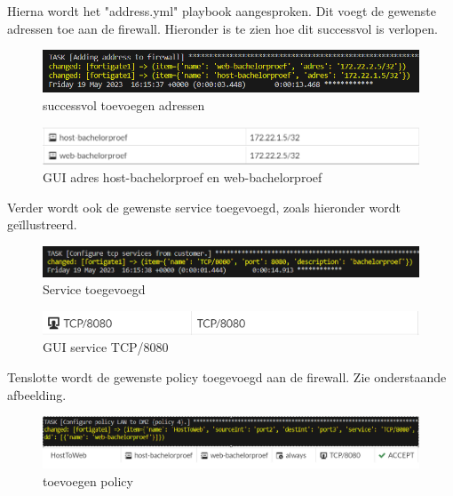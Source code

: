 Hierna wordt het "address.yml" playbook aangesproken. Dit voegt de gewenste adressen toe aan de firewall. Hieronder is te zien hoe dit successvol is verlopen.

\begin{figure}[h]
    \centering
    \includegraphics[width=158mm]{bachproef/graphics/address.png} 
    \caption{successvol toevoegen adressen}
    \label{fig:adressen}
\end{figure}

\begin{figure}[h]
    \centering
    \includegraphics[width=158mm]{bachproef/graphics/host+web.png} 
    \caption{GUI adres host-bachelorproef en web-bachelorproef}
    \label{fig:host-bachelorproef}
\end{figure}
\newpage
Verder wordt ook de gewenste service toegevoegd, zoals hieronder wordt geïllustreerd. 

\begin{figure}[h]
    \centering
    \includegraphics[width=158mm]{bachproef/graphics/service.png} 
    \caption{Service toegevoegd}
    \label{fig:service toegevoegd}
\end{figure}

\begin{figure}[h]
    \centering
    \includegraphics[width=158mm]{bachproef/graphics/gui_services.png} 
    \caption{GUI service TCP/8080}
    \label{fig:GUI_service}
\end{figure}
\newpage
Tenslotte wordt de gewenste policy toegevoegd aan de firewall. Zie onderstaande afbeelding. 

\begin{figure}[h]
    \centering
    \includegraphics[width=170mm]{bachproef/graphics/gui+cmd.png} 
    \caption{toevoegen policy}
    \label{fig:toevoegen policy}
\end{figure}

